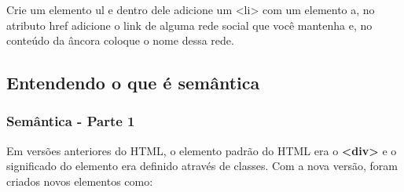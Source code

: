 \documentclass[12pt,a4paper]{article}
\begin{document}
	Crie um elemento ul e dentro dele adicione um <li> com um elemento a, no atributo href adicione o link de alguma rede social que você mantenha e, no conteúdo da âncora coloque o nome dessa rede.
	
	\subsection{Entendendo o que é semântica}
	\subsubsection{Semântica - Parte 1}
	
	Em versões anteriores do HTML, o elemento padrão do HTML era o \textbf{<div>} e o significado do elemento era definido através de classes. Com a nova versão, foram criados novos elementos como:
	
\end{document}
